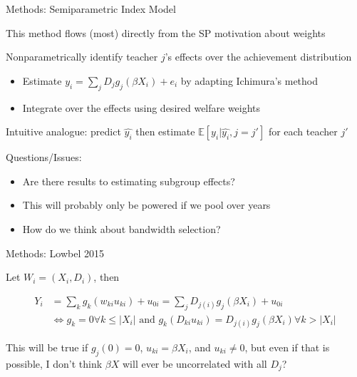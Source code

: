 \documentclass[t,aspectratio=169,11pt,presentation]{beamer}
\newenvironment{wideitemize}{\itemize\addtolength{\itemsep}{14pt}}{\enditemize}
\begin{document}
\begin{frame}{Methods: Semiparametric Index Model}

\begin{wideitemize}

    \item This method flows (most) directly from the SP motivation about weights
    
    \item  Nonparametrically identify teacher $j$'s effects over the achievement distribution
    \begin{itemize}
        \item Estimate $y_i = \sum _j D_j g_j(\beta X_i) +e_i$  by adapting Ichimura's method \citep{ichimura1993semiparametric}
        \item Integrate over the effects using desired welfare weights
    \end{itemize}
    
    \item Intuitive analogue: predict $\hat{y_i}$ then estimate $\mathbb{E}[y_i|\hat{y_i},j=j']$ for each teacher $j'$

    \item Questions/Issues:
    \begin{itemize}
         \item Are there results to estimating subgroup effects?
         \item This will probably only be powered if we pool over years
         \item How do we think about bandwidth selection? 
    \end{itemize}


\end{wideitemize}

\vfill
\begin{flushleft}

\hyperlink{next}{}
\end{flushleft}
\end{frame}

\begin{frame}{Methods: Lowbel 2015}

\begin{wideitemize}
\item Let $W_i = (X_i,D_i)$, then 

\begin{align*}
    Y_i &= \sum_k g_k (w_{ki} u_{ki}) +u_{0i} = \sum _j D_{j(i)} g_j(\beta X_i) +u_{0i} \\
        & \iff g_k = 0 \forall k\leq |X_i| \text{ and } g_k(D_{ki} u_{ki}) = D_{j(i)} g_j(\beta X_i) \forall k>|X_i| 
\end{align*}

\item This will be true if $g_j(0)=0$, $u_{ki}=\beta X_i$, and $u_{ki}\neq 0$, but even if that is possible, I don't think $\beta X$ will ever be uncorrelated with all $D_j$?
\end{wideitemize}
\end{frame}
\end{document}
